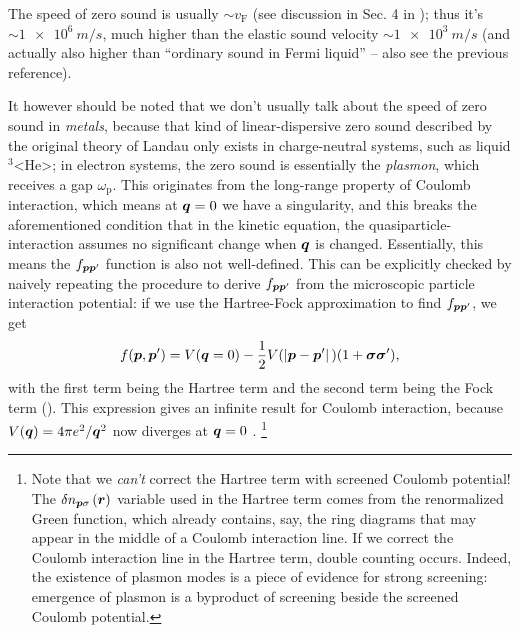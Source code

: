 \documentclass[hyperref, a4paper]{article}
\def\ce#1{<#1>}%
\begin{document}
The speed of zero sound is usually $\sim v_{\text{F}}$
(see discussion in Sec. 4 in \cite{lifshitz2013statistical});
thus it's $\sim \SI{1e6}{m/s}$, 
much higher than the elastic sound velocity $\sim \SI{1e3}{m/s}$
(and actually also higher than ``ordinary sound in Fermi liquid'' 
-- also see the previous reference).

It however should be noted that
we don't usually talk about the speed of zero sound in \emph{metals},
because that kind of linear-dispersive zero sound described 
by the original theory of Landau 
only exists in charge-neutral systems, 
such as liquid $^3$\ce{He};
in electron systems,
the zero sound is essentially the \emph{plasmon}, 
which receives a gap $\omega_{\text{p}}$.
This originates from the long-range property of Coulomb interaction,
which means at $\vb*{q} = 0$ we have a singularity, 
and this breaks the aforementioned condition 
that in the kinetic equation, 
the quasiparticle-interaction assumes no significant change when $\vb*{q}$ is changed. 
Essentially, this means the $f_{\vb*{p} \vb*{p}'}$ function is also not well-defined.
This can be explicitly checked by naively repeating the procedure 
to derive $f_{\vb*{p} \vb*{p}'}$ from the microscopic particle interaction potential:
if we use the Hartree-Fock approximation to find $f_{\vb*{p} \vb*{p}'}$, 
we get 
\begin{equation}
    f(\vb*{p}, \vb*{p}') = 
    V(\vb*{q} = 0) - \frac{1}{2} V(\abs*{\vb*{p} - \vb*{p}'}) (1 + \vb*{\sigma} \vb*{\sigma}'),
\end{equation}
with the first term being the Hartree term 
and the second term being the Fock term
().
This expression gives an infinite result for Coulomb interaction, 
because $V(\vb*{q}) = 4 \pi e^2 / \vb*{q}^2$ now diverges at $\vb*{q} = 0$ \cite{silin1958theory}.%
\footnote{
    Note that we \emph{can't} correct the Hartree term with screened Coulomb potential!
    The $\var{n}_{\vb*{p} \sigma}(\vb*{r})$ variable used in the Hartree term 
    comes from the renormalized Green function, 
    which already contains, say, the ring diagrams that may appear 
    in the middle of a Coulomb interaction line.
    If we correct the Coulomb interaction line in the Hartree term, 
    double counting occurs. 
    Indeed, the existence of plasmon modes is a piece of evidence for strong screening:
    emergence of plasmon is a byproduct of screening beside the screened Coulomb potential.
}
\end{document}
